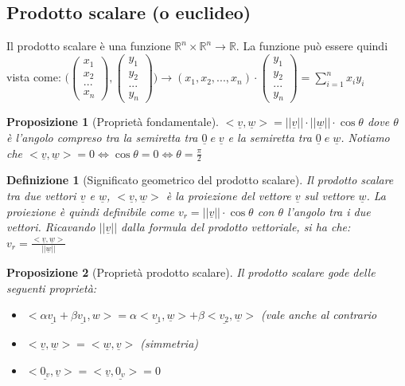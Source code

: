 \documentclass[12pt]{article}
\newenvironment{para}{\begin{adjustwidth}{13mm}{}}{\end{adjustwidth}}
\newtheorem{Definizione}{Definizione}[subsection]
\newtheorem{Proposizione}{Proposizione}[subsection]
\begin{document}
\begin{para}
\subsection{Prodotto scalare (o euclideo)}
Il prodotto scalare è una funzione $\mathbb{R}^n \times \mathbb{R}^n \rightarrow \mathbb{R}$. La funzione può essere quindi vista come: $\Biggl(\begin{pmatrix}
    x_1 \\
    x_2 \\
    ... \\
    x_n
\end{pmatrix} , \begin{pmatrix}
    y_1 \\
    y_2 \\
    ... \\
    y_n
\end{pmatrix}\Biggr) \rightarrow (x_1, x_2, ..., x_n) \cdot \begin{pmatrix}
    y_1 \\
    y_2 \\
    ... \\
    y_n
\end{pmatrix} = \sum_{i=1}^n x_i y_i$
\begin{Proposizione}[Proprietà fondamentale]
$<\underline{v}, \underline{w}> = \bigl||\underline{v}|\bigr| \cdot \bigl||\underline{w}|\bigr| \cdot \cos{\theta}$ dove $\theta$ è l'angolo compreso tra la semiretta tra $\underline{0} \; e \; \underline{v}$ e la semiretta tra $\underline{0} \; e \; \underline{w}$. Notiamo che $<\underline{v}, \underline{w}> = 0 \Leftrightarrow \cos{\theta} = 0 \Leftrightarrow \theta = \frac{\pi}{2}$
\end{Proposizione}
\begin{Definizione}[Significato geometrico del prodotto scalare]
Il prodotto scalare tra due vettori $\underline{v}$ e $\underline{w}$, $<\underline{v},\underline{w}>$ è la proiezione del vettore $\underline{v}$ sul vettore $\underline{w}$. La proiezione è quindi definibile come $v_r = \bigr||\underline{v}|\bigl| \cdot \cos{\theta}$ con $\theta$ l'angolo tra i due vettori. Ricavando $\bigr||\underline{v}|\bigl|$ dalla formula del prodotto vettoriale, si ha che: $v_r = \frac{<\underline{v},\underline{w}>}{\bigr||\underline{w}|\bigl|}$
\end{Definizione}
\begin{Proposizione}[Proprietà prodotto scalare]
Il prodotto scalare gode delle seguenti proprietà:\begin{itemize}
    \item $<\alpha \underline{v_1} + \beta \underline{v_1}, w> = \alpha<\underline{v_1}, \underline{w}> + \beta <\underline{v_2}, \underline{w}>$ (vale anche al contrario
    \item $<\underline{v}, \underline{w}> = <\underline{w}, \underline{v}>$ (simmetria)
    \item $<\underline{0_v}, \underline{v}> = <\underline{v}, \underline{0_v}> = 0$
\end{itemize}


\end{Proposizione}
\end{para}
\end{document}
